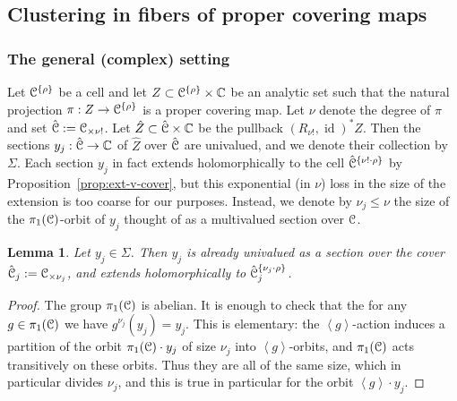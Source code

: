 \documentclass[reqno]{amsart}
\newtheorem{Lem}[Cor]{Lemma}{\bfseries}{\itshape}
\renewcommand\~[1]{\widetilde{#1}}
\def\<{\left<} \def\>{\right>} \def\({\left(} \def\){\right)}
\def\id{\operatorname{id}}
\def\he#1{{\{#1\}}}
\def\hrho{{\he\rho}}
\begin{document}
\subsection{Clustering in fibers of proper covering maps}

\subsubsection{The general (complex) setting}
\label{sec:cover-clustering}

Let $\cC^\hrho$ be a cell and let $Z\subset\cC^\hrho\times\C$ be an
analytic set such that the natural projection $\pi:Z\to\cC^\hrho$ is a
proper covering map. Let $\nu$ denote the degree of $\pi$ and set
$\hat{{\mathcal C}}:={\mathcal C}_{\times\nu!}$. Let $\hat Z\subset\hat{{\mathcal C}}\times{\mathbb C}$ be the
pullback $(R_{\nu!},\id)^*Z$. Then the sections $y_j:\hat{{\mathcal C}}\to{\mathbb C}$ of
$\hat Z$ over $\hat{{\mathcal C}}$ are univalued, and we denote their collection
by $\Sigma$. Each section $y_j$ in fact extends holomorphically to the
cell $\hat\cC^{\he{\nu!\cdot\rho}}$ by
Proposition~\ref{prop:ext-v-cover}, but this exponential (in $\nu$)
loss in the size of the extension is too coarse for our
purposes. Instead, we denote by $\nu_j\le\nu$ the size of the
$\pi_1({\mathcal C})$-orbit of $y_j$ thought of as a multivalued section over
${\mathcal C}$.

\begin{Lem}\label{lem:y_j-monodromy}
  Let $y_j\in\Sigma$. Then $y_j$ is already univalued as a section
  over the cover $\hat{{\mathcal C}}_j:={\mathcal C}_{\times\nu_j}$, and extends
  holomorphically to $\hat\cC_j^{\he{\nu_j\cdot\rho}}$.
\end{Lem}
\begin{proof}
  The group $\pi_1({\mathcal C})$ is abelian.  It is enough to check that the
  for any $g\in\pi_1({\mathcal C})$ we have $g^{\nu_j}(y_j)=y_j$. This is
  elementary: the $\<g\>$-action induces a partition of the orbit
  $\pi_1({\mathcal C})\cdot y_j$ of size $\nu_j$ into $\<g\>$-orbits, and
  $\pi_1({\mathcal C})$ acts transitively on these orbits. Thus they are all of
  the same size, which in particular divides $\nu_j$, and this is true
  in particular for the orbit $\<g\>\cdot y_j$.
\end{proof}
\end{document}
